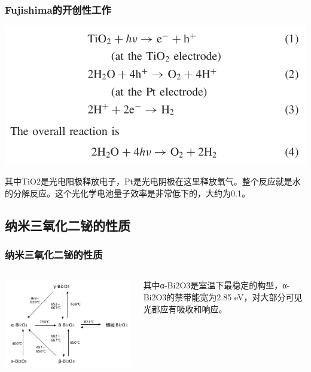 \documentclass[xetex,compress]{mybeamer}
\begin{document}
\begin{frame}
\frametitle{Fujishima的开创性工作}
\begin{block}{}
\centering
\includegraphics[scale=0.3]{figures/光分解水化学反应式} 
\end{block}
\begin{block}{}
其中TiO2是光电阳极释放电子，Pt是光电阴极在这里释放氧气。整个反应就是水的分解反应。这个光化学电池量子效率是非常低下的，大约为0.1。
\end{block}
\end{frame}

\subsection{纳米三氧化二铋的性质}
\begin{frame}
\frametitle{纳米三氧化二铋的性质}
\begin{columns}
\begin{block}{}
\centering
\includegraphics[width=\linewidth]{figures/Bi2O3转变温度} 
\end{block}
\begin{block}{}
其中α-Bi2O3是室温下最稳定的构型，α-Bi2O3的禁带能宽为2.85 eV，对大部分可见光都应有吸收和响应。
\end{block}
\end{columns}
\end{frame}
\end{document}
